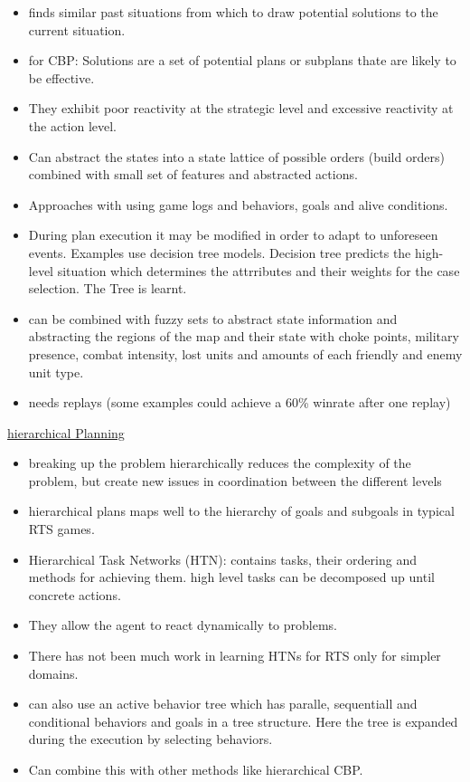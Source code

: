 \begin{itemize}[noitemsep,nolistsep]
	\item finds similar past situations from which to draw potential solutions to the current situation.
	\item for CBP: Solutions are a set of potential plans or subplans thate are likely to be effective.
	\item They exhibit poor reactivity at the strategic level and excessive reactivity at the action level.
	\item Can abstract the states into a state lattice of possible orders (build orders) combined with small set of features and abstracted actions.
	\item Approaches with using game logs and behaviors, goals and alive conditions.
	\item During plan execution it may be modified in order to adapt to unforeseen events. Examples use decision tree models. Decision tree predicts the high-level situation which determines the attrributes and their weights for the case selection. The Tree is learnt.
	\item can be combined with fuzzy sets to abstract state information and abstracting the regions of the map and their state with choke points, military presence, combat intensity, lost units and amounts of each friendly and enemy unit type.
	\item needs replays (some examples could achieve a 60\% winrate after one replay)
\end{itemize}
\underline{hierarchical Planning}
\begin{itemize}[noitemsep,nolistsep]
	\item breaking up the problem hierarchically reduces the complexity of the problem, but create new issues in coordination between the different levels 
	\item hierarchical plans maps well to the hierarchy of goals and subgoals in typical RTS games.
	\item Hierarchical Task Networks (HTN): contains tasks, their ordering and methods for achieving them. high level tasks can be decomposed up until concrete actions.
	\item They allow the agent to react dynamically to problems. 
	\item There has not been much work in learning HTNs for RTS only for simpler domains.
	\item can also use an active behavior tree which has paralle, sequentiall and conditional behaviors and goals in a tree structure. Here the tree is expanded during the execution by selecting behaviors. 
	\item Can combine this with other methods like hierarchical CBP.
\end{itemize}

